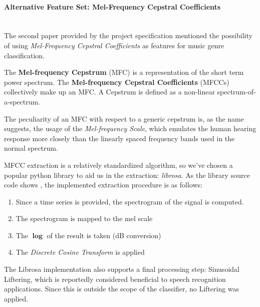 \documentclass[12pt]{article}
\begin{document}
	\paragraph{Alternative Feature Set: Mel-Frequency Cepstral Coefficients}\mbox{}\\\newline
	The second paper provided by the project specification \cite{classification} mentioned the possibility of using \textit{Mel-Frequency Cepstral Coefficients} as features for music genre classification.
	
	The \textbf{Mel-frequency Cepstrum} (MFC) is a representation of the short term power spectrum. The \textbf{Mel-frequency Cepstral Coefficients} (MFCCs) collectively make up an MFC. A Cepstrum is defined as a non-linear spectrum-of-a-spectrum.
	
	The peculiarity of an MFC with respect to a generic cepstrum is, as the name suggests, the usage of the \textit{Mel-frequency Scale}, which emulates the human hearing response more closely than the linearly spaced frequency bands used in the normal spectrum.
	
	MFCC extraction is a relatively standardized algorithm, so we've chosen a popular python library to aid us in the extraction: \textit{librosa}. As the library source code shows \cite{librosarepo}, the implemented extraction procedure is as follows:
	\begin{enumerate}
	\item Since a time series is provided, the spectrogram of the signal is computed.
	\item The spectrogram is mapped to the mel scale
	\item The $\mathbf{\log}$ of the result is taken (dB conversion)
	\item The \textit{Discrete Cosine Transform} is applied
	\end{enumerate}
	
	The Librosa implementation also supports a final processing step: Sinusoidal Liftering, which is reportedly considered beneficial to speech recognition applications. Since this is outside the scope of the classifier, no Liftering was applied.
	
\end{document}
